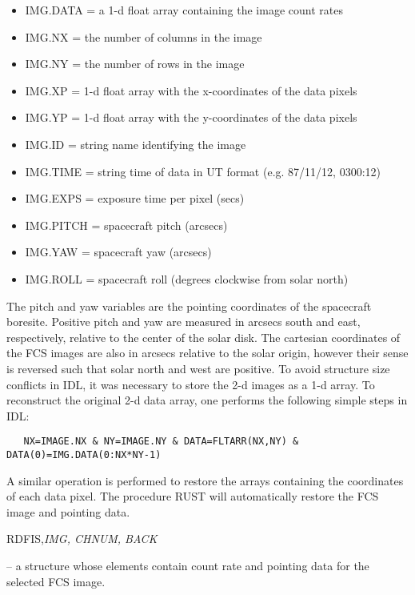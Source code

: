 {{{\begin{itemize}

\item  IMG.DATA  = a 1-d float array containing the image count rates
\item  IMG.NX    = the number of columns in the image
\item  IMG.NY    = the number of rows in the image
\item  IMG.XP    = 1-d float array with the x-coordinates of the data pixels
\item  IMG.YP    = 1-d float array with the y-coordinates of the data pixels
\item  IMG.ID    = string name identifying the image
\item  IMG.TIME  = string time of data in UT format (e.g. 87/11/12, 0300:12)
\item  IMG.EXPS  = exposure time per pixel (secs)
\item  IMG.PITCH = spacecraft pitch (arcsecs)
\item  IMG.YAW   = spacecraft yaw (arcsecs)
\item  IMG.ROLL  = spacecraft roll (degrees clockwise from solar north)

\end{itemize}

The pitch and yaw variables  are the pointing  coordinates of the spacecraft
boresite. Positive pitch and yaw are measured in arcsecs  south and east,
respectively,  relative to the center of the solar disk.  The cartesian
coordinates of the FCS images are also in arcsecs  relative to the solar
origin, however their sense is reversed such that solar north  and west are
positive. To avoid structure size conflicts in IDL, it was necessary  to store
the 2-d images as a 1-d array. To reconstruct the original 2-d data  array, one
performs the following simple steps in IDL:
\begin{verbatim}
   NX=IMAGE.NX & NY=IMAGE.NY & DATA=FLTARR(NX,NY) & DATA(0)=IMG.DATA(0:NX*NY-1)
\end{verbatim}
A similar operation is performed to restore the arrays  containing
the coordinates of each data pixel. The procedure RUST will automatically
restore the FCS image and pointing data.


\noindent RDFIS,{\it IMG, CHNUM, BACK}


 -- a structure whose elements contain count
rate and pointing data for the selected FCS image.

}}}
